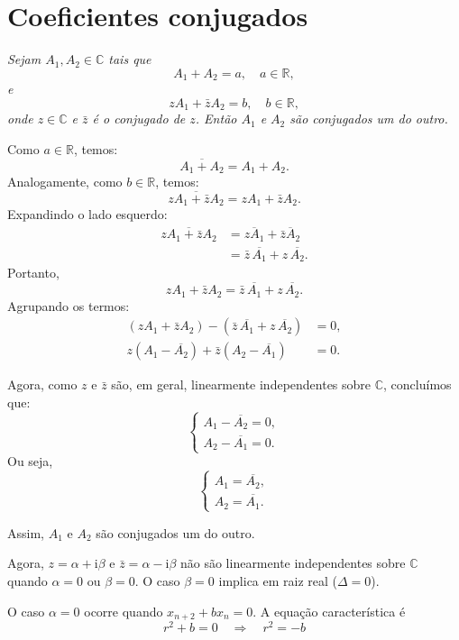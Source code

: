 \documentclass{article}
\begin{document}
\appendix


\section{Coeficientes conjugados}

\emph{Sejam \( A_1, A_2 \in \mathbb{C} \) tais que
\[
A_1 + A_2 = a, \quad a \in \mathbb{R},
\]
e
\[
z A_1 + \bar{z} A_2 = b, \quad b \in \mathbb{R},
\]
onde \( z \in \mathbb{C} \) e \( \bar{z} \) é o conjugado de \( z \).
Então \( A_1 \) e \( A_2 \) são conjugados um do outro.  }

\bigskip

Como \( a \in \mathbb{R} \), temos:
\[
\overline{A_1 + A_2} = A_1 + A_2.
\]
Analogamente, como \( b \in \mathbb{R} \), temos:
\[
\overline{z A_1 + \bar{z} A_2} = z A_1 + \bar{z} A_2.
\]
Expandindo o lado esquerdo:
\begin{align*}
\overline{z A_1 + \bar{z} A_2} &= \overline{z A_1} + \overline{\bar{z} A_2} \\
&= \bar{z} \, \overline{A_1} + z \, \overline{A_2}.
\end{align*}
Portanto,
\[
z A_1 + \bar{z} A_2 = \bar{z} \, \overline{A_1} + z \, \overline{A_2}.
\]
Agrupando os termos:
\begin{align*}
(z A_1 + \bar{z} A_2) - (\bar{z} \, \overline{A_1} + z \, \overline{A_2}) &= 0, \\
z (A_1 - \overline{A_2}) + \bar{z} (A_2 - \overline{A_1}) &= 0.
\end{align*}

Agora, como \( z \) e \( \bar{z} \) são, em geral, linearmente independentes sobre \(\mathbb{C}\), concluímos que:
\[
\begin{cases}
A_1 - \overline{A_2} = 0, \\
A_2 - \overline{A_1} = 0.
\end{cases}
\]
Ou seja,
\[
\begin{cases}
A_1 = \overline{A_2}, \\
A_2 = \overline{A_1}.
\end{cases}
\]

Assim, \( A_1 \) e \( A_2 \) são conjugados um do outro.

Agora, \( z = \alpha + \mathrm{i} \beta \) e
\( \bar{z} = \alpha - \mathrm{i} \beta \) não são linearmente
independentes sobre \(\mathbb{C}\) quando $\alpha = 0$ ou $\beta = 0$.
O caso $\beta =0$ implica em raiz real ($\Delta = 0$).

O caso $\alpha = 0 $ ocorre quando $x_{n+2} + bx_n =0$.  A equação
característica é
\[
r^2 + b = 0
\quad \Rightarrow \quad
r^2 = -b
\]
\end{document}
